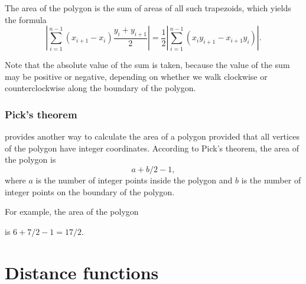 The area of the polygon is the sum of areas of
all such trapezoids, which yields the formula
\[|\sum_{i=1}^{n-1} (x_{i+1}-x_{i}) \frac{y_i+y_{i+1}}{2}| =
    \frac{1}{2} |\sum_{i=1}^{n-1} (x_i y_{i+1} - x_{i+1} y_i)|.\]

Note that the absolute value of the sum is taken,
because the value of the sum may be positive or negative,
depending on whether we walk clockwise or counterclockwise
along the boundary of the polygon.

\subsubsection{Pick's theorem}


 provides another way to calculate
the area of a polygon provided that all vertices
of the polygon have integer coordinates.
According to Pick's theorem, the area of the polygon is
\[ a + b/2 -1,\]
where $a$ is the number of integer points inside the polygon
and $b$ is the number of integer points on the boundary of the polygon.

For example, the area of the polygon
\begin{center}
\end{center}
is $6+7/2-1=17/2$.

\section{Distance functions}

